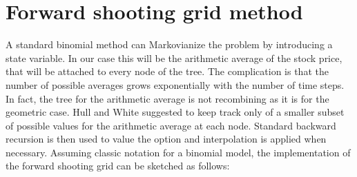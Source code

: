 \documentclass[12pt]{article}
\numberwithin{equation}{section}
\begin{document}
\section{Forward shooting grid method}
A standard binomial method can Markovianize the problem by introducing a state variable. In our case this will be the arithmetic average of the stock price, that will be attached to every node of the tree. The complication is that the number of possible averages grows exponentially with the number of time steps. In fact, the tree for the arithmetic average is not recombining as it is for the geometric case. Hull and White \cite{HullWhite} suggested to keep track only of a smaller subset of possible values for the arithmetic average at each node. Standard backward recursion is then used to value the option and interpolation is applied when necessary. Assuming classic notation for a binomial model, the implementation of the forward shooting grid can be sketched as follows:
\end{document}
